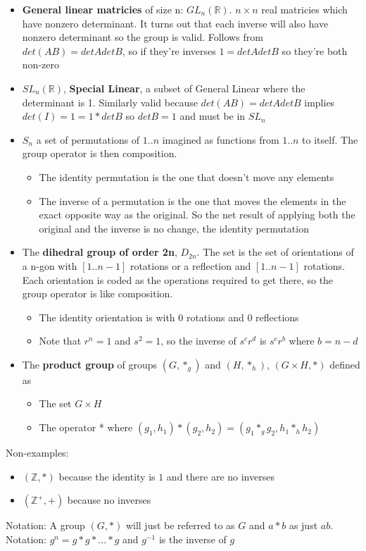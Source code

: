 \documentclass{article}
\begin{document}
\begin{itemize}
    \item \textbf{General linear matricies} of size n: $GL_n(\mathbb{R})$. $n \times n$ real matricies which have nonzero determinant. It turns out that each inverse will also have nonzero determinant so the group is valid. Follows from $det(AB) = detAdetB$, so if they're inverses $1 = detAdetB$ so they're both non-zero
    \item $SL_n(\mathbb{R})$, \textbf{Special Linear}, a subset of General Linear where the determinant is 1. Similarly valid because $det(AB) = detAdetB$ implies $det(I) = 1 = 1 * detB$ so $detB = 1$ and must be in $SL_n$
    \item $S_n$ a set of permutations of ${1..n}$ imagined as functions from ${1..n}$ to itself. The group operator is then composition. 
    \begin{itemize}
        \item The identity permutation is the one that doesn't move any elements
        \item The inverse of a permutation is the one that moves the elements in the exact opposite way as the original. So the net result of applying both the original and the inverse is no change, the identity permutation
    \end{itemize}
    \item The \textbf{dihedral group of order 2n}, $D_{2n}$. The set is the set of orientations of a n-gon with $[1..n-1]$ rotations or a reflection and $[1..n-1]$ rotations. Each orientation is coded as the operations required to get there, so the group operator is like composition.
    \begin{itemize}
        \item The identity orientation is with 0 rotations and 0 reflections
        \item Note that $r^n = 1$ and $s^2 = 1$, so the inverse of $s^cr^d$ is $s^cr^b$ where $b = n - d$
    \end{itemize}
    \item The \textbf{product group} of groups $(G,*_g)$ and $(H,*_h)$,  $(G\times H,*)$ defined as
    \begin{itemize}
        \item The set $G\times H$
        \item The operator * where $(g_1,h_1)*(g_2,h_2) = (g_1*_g g_2, h_1 *_h h_2)$
    \end{itemize}
    
\end{itemize}
Non-examples:
\begin{itemize}
    \item $(\mathbb{Z},*)$ because the identity is $1$ and there are no inverses
    \item $(\mathbb{Z}^+,+)$ because no inverses
\end{itemize}
Notation: A group $(G,*)$ will just be referred to as $G$ and $a*b$ as just $ab$.
Notation: $g^n = g*g*...*g$ and $g^{-1}$ is the inverse of $g$
\end{document}
